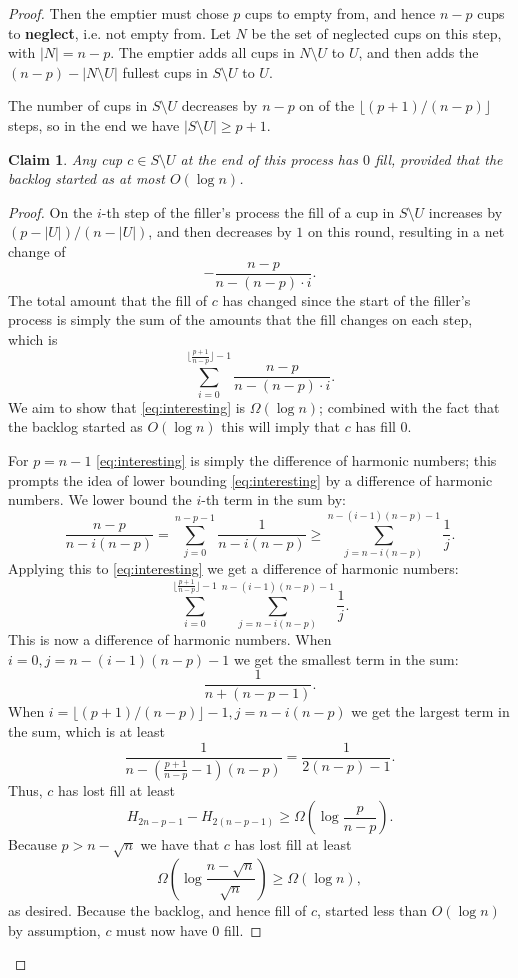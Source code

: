 \documentclass[11pt]{article}
\newtheorem{clm}{Claim}
\begin{document}
\begin{proof}
Then the emptier must chose $p$ cups to empty from, and hence
$n-p$ cups to \textbf{neglect}, i.e. not empty from. Let $N$ be
the set of neglected cups on this step, with $|N| = n-p$. The
emptier adds all cups in $N \setminus U$ to $U$, and then
adds the $(n-p) - |N\setminus U |$ fullest cups in $S
\setminus U$ to $U$. 

The number of cups in $S\setminus U$ decreases by $n-p$ on of the
$\lfloor (p+1) / (n-p) \rfloor$ steps, so in the end we have
$|S\setminus U| \ge p+1$.

\begin{clm}
  Any cup $c \in S\setminus U$ at the end of this process has $0$
  fill, provided that the backlog started as at most $O(\log n)$.
\end{clm}
\begin{proof}
On the $i$-th step of the filler's process the fill of a
cup in $S \setminus U$ increases by $(p-|U|)/(n-|U|)$, and then
decreases by $1$ on this round, resulting in a net change of
$$-\frac{n-p}{n-(n-p)\cdot i}.$$
The total amount that the fill of $c$ has changed since
the start of the filler's process is simply the sum of the
amounts that the fill changes on each step, which is
\begin{equation}
  \label{eq:interesting}
\sum_{i=0}^{\big\lfloor \frac{p+1}{n-p}\big\rfloor - 1} \frac{n-p}{n-(n-p)\cdot i}.
\end{equation}
We aim to show that \eqref{eq:interesting} is $\Omega(\log n)$; combined
with the fact that the backlog started as $O(\log n)$ this will
imply that $c$ has fill $0$.

For $p=n-1$ \eqref{eq:interesting} is simply the difference of
harmonic numbers; this prompts the idea of lower bounding
\eqref{eq:interesting} by a difference of harmonic numbers.
We lower bound the $i$-th term in the sum by:
$$\frac{n-p}{n-i(n-p)} = \sum_{j=0}^{n-p-1} \frac{1}{n-i(n-p)} \ge \sum_{j=n-i(n-p)}^{n-(i-1)(n-p)-1}\frac{1}{j}.$$
Applying this to \eqref{eq:interesting} we get a difference of
harmonic numbers:
$${\sum_{i=0}^{\big\lfloor\frac{p+1}{n-p}\big\rfloor -
1}}\sum_{j=n-i(n-p)}^{n-(i-1)(n-p)-1} \frac{1}{j}.$$
This is now a difference of harmonic numbers. When $i=0,
j=n-(i-1)(n-p)-1$ we get the smallest term in the sum:
$$\frac{1}{n+(n-p-1)}.$$ 
When $i = \lfloor(p+1) / (n-p)\rfloor - 1, j=n-i(n-p)$ we get the largest
term in the sum, which is at least 
$$\frac{1}{n - \left(\frac{p+1}{n-p} -1\right) (n-p)} =
\frac{1}{2(n-p)-1}.$$
Thus, $c$ has lost fill at least 
$$H_{2n-p-1} - H_{2(n-p-1)} \ge \Omega\left(\log \frac{p}{n-p}\right).$$
Because $p > n-\sqrt{n}$ we have that $c$ has lost fill at least
$$\Omega\left(\log \frac{n-\sqrt{n}}{\sqrt{n}}\right) \ge
\Omega(\log n),$$
as desired. Because the backlog, and hence fill of $c$, started
less than $O(\log n)$ by assumption, $c$ must
now have $0$ fill.
\end{proof}


\end{proof}
\end{document}
